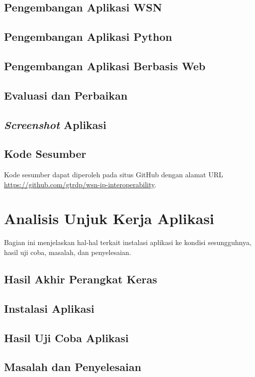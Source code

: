 		\subsection{Pengembangan Aplikasi WSN}
		\subsection{Pengembangan Aplikasi Python}
		\subsection{Pengembangan Aplikasi Berbasis Web}
		\subsection{Evaluasi dan Perbaikan}
		\subsection{\emph{Screenshot} Aplikasi}
		\subsection{Kode Sesumber}
			Kode sesumber dapat diperoleh pada situs GitHub dengan alamat URL \url{https://github.com/gtrdp/wsn-ip-interoperability}.


	\section{Analisis Unjuk Kerja Aplikasi}
		Bagian ini menjelaskan hal-hal terkait instalasi aplikasi ke kondisi sesungguhnya, hasil uji coba, masalah, dan penyelesaian.

		\subsection{Hasil Akhir Perangkat Keras}
		\subsection{Instalasi Aplikasi}
		\subsection{Hasil Uji Coba Aplikasi}
		\subsection{Masalah dan Penyelesaian}
